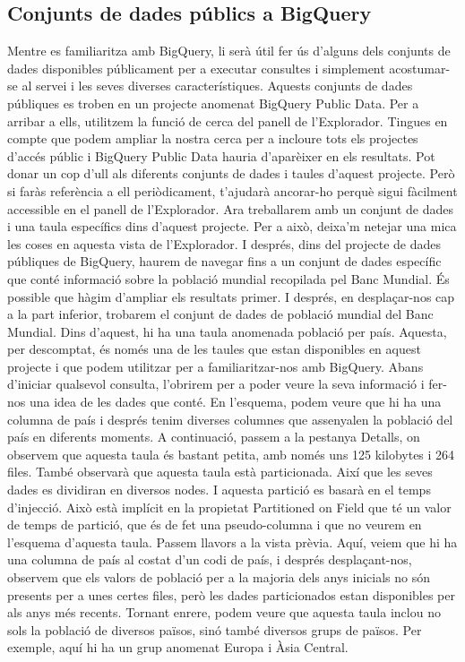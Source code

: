 \documentclass[12pt,longbibliography]{article}
\theoremstyle{definition}
\theoremstyle{remark}
\begin{document}
\subsection{Conjunts de dades públics a BigQuery}

Mentre es familiaritza amb BigQuery, li serà útil fer ús d'alguns dels conjunts de dades disponibles públicament per a executar consultes i simplement acostumar-se al servei i les seves diverses característiques. Aquests conjunts de dades públiques es troben en un projecte anomenat BigQuery Public Data. Per a arribar a ells, utilitzem la funció de cerca del panell de l'Explorador. Tingues en compte que podem ampliar la nostra cerca per a incloure tots els projectes d'accés públic i BigQuery Public Data hauria d'aparèixer en els resultats. Pot donar un cop d'ull als diferents conjunts de dades i taules d'aquest projecte. Però si faràs referència a ell periòdicament, t'ajudarà ancorar-ho perquè sigui fàcilment accessible en el panell de l'Explorador. Ara treballarem amb un conjunt de dades i una taula específics dins d'aquest projecte. Per a això, deixa'm netejar una mica les coses en aquesta vista de l'Explorador. I després, dins del projecte de dades públiques de BigQuery, haurem de navegar fins a un conjunt de dades específic que conté informació sobre la població mundial recopilada pel Banc Mundial. És possible que hàgim d'ampliar els resultats primer. I després, en desplaçar-nos cap a la part inferior, trobarem el conjunt de dades de població mundial del Banc Mundial. Dins d'aquest, hi ha una taula anomenada població per país. Aquesta, per descomptat, és només una de les taules que estan disponibles en aquest projecte i que podem utilitzar per a familiaritzar-nos amb BigQuery. Abans d'iniciar qualsevol consulta, l'obrirem per a poder veure la seva informació i fer-nos una idea de les dades que conté. En l'esquema, podem veure que hi ha una columna de país i després tenim diverses columnes que assenyalen la població del país en diferents moments. A continuació, passem a la pestanya Detalls, on observem que aquesta taula és bastant petita, amb només uns 125 kilobytes i 264 files. També observarà que aquesta taula està particionada. Així que les seves dades es dividiran en diversos nodes. I aquesta partició es basarà en el temps d'injecció. Això està implícit en la propietat Partitioned on Field que té un valor de temps de partició, que és de fet una pseudo-columna i que no veurem en l'esquema d'aquesta taula. Passem llavors a la vista prèvia. Aquí, veiem que hi ha una columna de país al costat d'un codi de país, i després desplaçant-nos, observem que els valors de població per a la majoria dels anys inicials no són presents per a unes certes files, però les dades particionados estan disponibles per als anys més recents. Tornant enrere, podem veure que aquesta taula inclou no sols la població de diversos països, sinó també diversos grups de països. Per exemple, aquí hi ha un grup anomenat Europa i Àsia Central.
\end{document}
